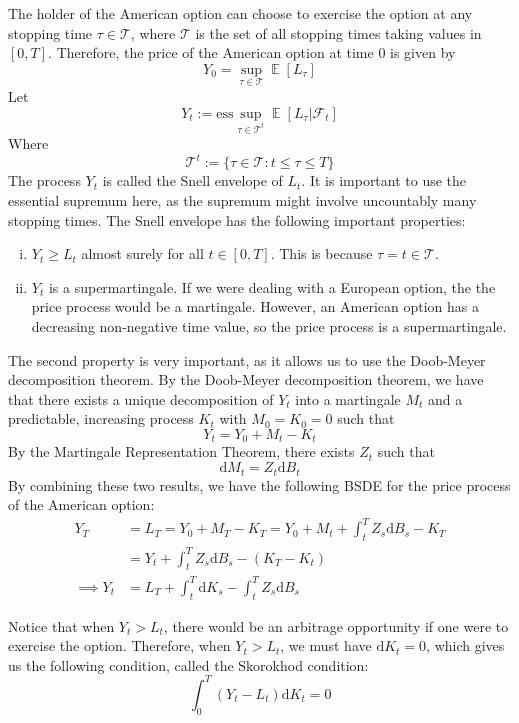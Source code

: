 \documentclass{amsart}
\newcommand{\cF}{\mathcal{F}}
\newcommand{\cT}{\mathcal{T}}
\DeclareMathOperator{\ee}{\mathbb E}
\theoremstyle{definition}
\theoremstyle{remark}
\numberwithin{equation}{section}
\begin{document}
The holder of the American option can choose to exercise the option at any stopping time $\tau \in \cT$, where $\cT$ is the set of all stopping times taking values in $[0, T]$.
Therefore, the price of the American option at time $0$ is given by
\begin{equation}
    Y_0 = \sup_{\tau \in \cT} \ee [L_\tau]
\end{equation}
Let 
\begin{equation}
    Y_t := \mathrm{ess}\sup_{\tau \in \cT^t} \ee [L_\tau | \cF_t]
\end{equation}
Where 
\begin{equation}
    \cT^t := \{\tau \in \cT : t \le \tau \le T\}
\end{equation}
The process $Y_t$ is called the Snell envelope of $L_t$. It is important to use the essential supremum here, as the supremum might involve uncountably many stopping times.
The Snell envelope has the following important properties:
\begin{enumerate}[i)]
    \item $Y_t \ge L_t$ almost surely for all $t \in [0, T]$. This is because $\tau = t \in \cT$.
    \item $Y_t$ is a supermartingale. If we were dealing with a European option, the the price process would be a martingale. However, an American option has a decreasing non-negative time value, so the price process is a supermartingale.
\end{enumerate}
The second property is very important, as it allows us to use the Doob-Meyer decomposition theorem.
By the Doob-Meyer decomposition theorem, we have that there exists a unique decomposition of $Y_t$ into a martingale $M_t$ and a predictable, increasing process $K_t$ with $M_0 = K_0 = 0$ such that
\[
Y_t = Y_0 + M_t - K_t
\]
By the Martingale Representation Theorem, there exists $Z_t$ such that
\[
\mathrm{d} M_t = Z_t \mathrm{d} B_t
\]
By combining these two results, we have the following BSDE for the price process of the American option:
\begin{align*}
    Y_T &= L_T = Y_0 + M_T - K_T = Y_0 + M_t + \int_t^T Z_s \mathrm{d}B_s - K_T\\
    &= Y_t + \int_t^T Z_s \mathrm{d} B_s - (K_T - K_t) \\
    \implies Y_t &= L_T + \int_t^T \mathrm{d} K_s - \int_t^T Z_s \mathrm{d} B_s
\end{align*}

Notice that when $Y_t > L_t$, there would be an arbitrage opportunity if one were to exercise the option. 
Therefore, when $Y_t > L_t$, we must have $\mathrm{d} K_t = 0$, which gives us the following condition, called the Skorokhod condition:
\begin{equation}
    \int_0^T (Y_t - L_t) \mathrm{d} K_t = 0
\end{equation}
\end{document}
